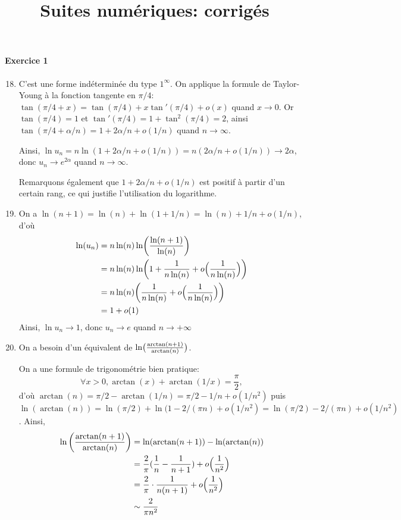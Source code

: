 \documentclass{yann}
\newcommand\Exo[1]{\paragraph{Exercice #1}}
\begin{document}
\title{Suites numériques: corrigés}
\maketitle

\Exo{1}
\begin{enumerate}
\setcounter{enumi}{17}
\item
  C'est une forme indéterminée du type $1^\infty$.
  On applique la formule de Taylor-Young à la fonction tangente en $\pi/4$:
  $\tan(\pi/4+x) = \tan(\pi/4) + x \tan'(\pi/4) + o(x)$ quand $x \to 0$.
  Or $\tan(\pi/4) = 1$ et $\tan'(\pi/4) = 1+\tan^2(\pi/4) = 2$, ainsi
  $\tan(\pi/4+\alpha/n) = 1+2\alpha/n + o(1/n)$ quand $n\to\infty$.

  Ainsi, $\ln u_n = n \ln(1+2\alpha/n + o(1/n)) = n(2\alpha/n + o(1/n)) \to 2\alpha$,
  donc $u_n \to e^{2\alpha}$ quand $n\to\infty$.

  Remarquons également que $1+2\alpha/n+o(1/n)$ est positif à partir d'un certain rang, ce qui justifie l'utilisation du logarithme.

\item
  On a $\ln(n+1) = \ln(n) + \ln(1+1/n) = \ln(n) + 1/n + o(1/n)$,
  d'où
  \begin{align*}
    \ln(u_n) &= n\ln(n) \ln \biggl({\frac{\ln(n+1)}{\ln(n)}}\biggr) \\
             &= n\ln(n) \ln \biggl({ 1 + \frac{1}{n\ln(n)} + o\Bigl({\frac{1}{n\ln(n)}}\Bigr) }\biggr) \\
             &= n\ln(n) \biggl({ \frac{1}{n\ln(n)} + o\Bigl({\frac{1}{n\ln(n)}}\Bigr) }\biggr) \\
             &= 1 + o(1)
  \end{align*}
  Ainsi, $\ln u_n \to 1$, donc $u_n \to e$ quand $n \to +\infty$

\item
  On a besoin d'un équivalent de $\ln\bigl({\frac{\arctan(n+1)}{\arctan(n)}}\bigr)$.

  On a une formule de trigonométrie bien pratique:
  \[ \forall x > 0, \arctan(x) + \arctan(1/x) = \frac\pi2, \]
  d'où $\arctan(n) = \pi/2 - \arctan(1/n) = \pi/2 - 1/n + o(1/n^2)$
  puis $\ln(\arctan(n)) = \ln(\pi/2) + \ln(1-2/(\pi n) + o(1/n^2)
  = \ln(\pi/2) - 2/(\pi n) + o(1/n^2)$.
  Ainsi,
  \begin{align*}
  \ln\left({\frac{\arctan(n+1)}{\arctan(n)}}\right)
     &= \ln(\arctan(n+1)) - \ln(\arctan(n)) \\
     &= \frac{2}{\pi} ({ \frac{1}{n} - \frac{1}{n+1} }) + o\Bigl({\frac{1}{n^2}}\Bigr) \\
     &= \frac{2}{\pi} \cdot \frac{1}{n(n+1)} + o\Bigl({\frac{1}{n^2}}\Bigr) \\
     &\sim \frac{2}{\pi n^2}
  \end{align*}


\end{enumerate}
\end{document}
